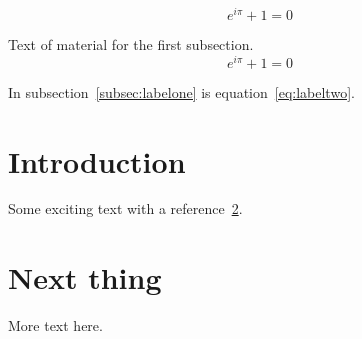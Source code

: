 \documentclass{article}
\begin{document}
\begin{equation}
e^{i\pi}+1 = 0
\end{equation}

Text of material for the first subsection.
\begin{equation}
e^{i\pi}+1 = 0
\label{eq:labeltwo}
\end{equation}

In subsection~\ref{subsec:labelone} is equation~\ref{eq:labeltwo}.

\section{Introduction}
Some exciting text with a reference~\ref{sec:next}.

\section{Next thing}
\label{sec:next}

More text here.
\end{document}
